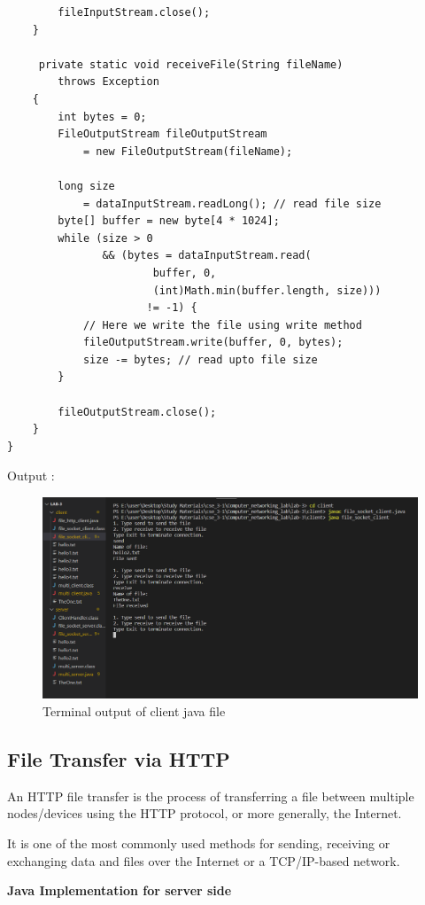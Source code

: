 \documentclass[11pt]{article}
\begin{document}
\begin{verbatim}
		fileInputStream.close();
	}

	 private static void receiveFile(String fileName)
        throws Exception
    {
        int bytes = 0;
        FileOutputStream fileOutputStream
            = new FileOutputStream(fileName);
 
        long size
            = dataInputStream.readLong(); // read file size
        byte[] buffer = new byte[4 * 1024];
        while (size > 0
               && (bytes = dataInputStream.read(
                       buffer, 0,
                       (int)Math.min(buffer.length, size)))
                      != -1) {
            // Here we write the file using write method
            fileOutputStream.write(buffer, 0, bytes);
            size -= bytes; // read upto file size
        }
	    
        fileOutputStream.close();
    }
}
\end{verbatim}


 Output : 
\begin{figure}[!h]
\centering
\includegraphics[width=\textwidth]{so_client.png}
\caption{Terminal output of client java file }
\end{figure}
\FloatBarrier

\subsection{File Transfer via HTTP}

An HTTP file transfer is the process of transferring a file between multiple nodes/devices using the HTTP protocol, or more generally, the Internet.

It is one of the most commonly used methods for sending, receiving or exchanging data and files over the Internet or a TCP/IP-based network.

\pagebreak
\textbf{Java Implementation for server side}\\[12pt]
\end{document}
